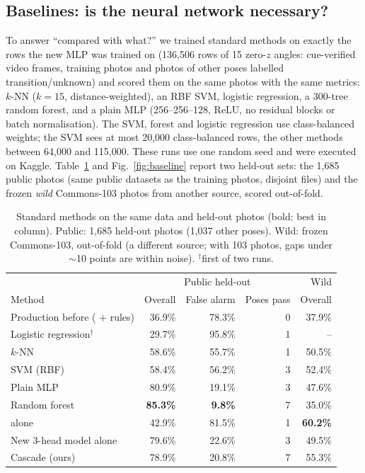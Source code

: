 \subsection{Baselines: is the neural network necessary?}\label{sec:baselines}
To answer ``compared with what?'' we trained standard methods on exactly the rows the new MLP was trained on (136{,}506 rows of 15 zero-$z$ angles: cue-verified video frames, training photos and photos of other poses labelled transition/unknown) and scored them on the same photos with the same metrics: $k$-NN ($k{=}15$, distance-weighted), an RBF SVM, logistic regression, a 300-tree random forest, and a plain MLP (256--256--128, ReLU, no residual blocks or batch normalisation). The SVM, forest and logistic regression use class-balanced weights; the SVM sees at most 20{,}000 class-balanced rows, the other methods between 64{,}000 and 115{,}000. These runs use one random seed and were executed on Kaggle. Table~\ref{tab:baseline} and Fig.~\ref{fig:baseline} report two held-out sets: the 1{,}685 public photos (same public datasets as the training photos, disjoint files) and the frozen \emph{wild} Commons-103 photos from another source, scored out-of-fold.
\begin{table}[t]
\centering\footnotesize\setlength{\tabcolsep}{3.5pt}
\caption{Standard methods on the same data and held-out photos (bold: best in column). Public: 1{,}685 held-out photos (1{,}037 other poses). Wild: frozen Commons-103, out-of-fold (a different source; with 103 photos, gaps under $\sim$10 points are within noise). $^\dagger$first of two runs.}\label{tab:baseline}
\begin{tabular}{@{}lrrrr@{}}
\toprule
 & \multicolumn{3}{c}{Public held-out} & Wild \\
Method & Overall & False alarm & Poses pass & Overall \\ \midrule
Production before (\vfour{} + rules) & 36.9\% & 78.3\% & 0 & 37.9\% \\
Logistic regression$^\dagger$ & 29.7\% & 95.8\% & 1 & -- \\
$k$-NN & 58.6\% & 55.7\% & 1 & 50.5\% \\
SVM (RBF) & 58.4\% & 56.2\% & 3 & 52.4\% \\
Plain MLP & 80.9\% & 19.1\% & 3 & 47.6\% \\
Random forest & \textbf{85.3\%} & \textbf{9.8\%} & 7 & 35.0\% \\
\vfour{} alone & 42.9\% & 81.5\% & 1 & \textbf{60.2\%} \\
New 3-head model alone & 79.6\% & 22.6\% & 3 & 49.5\% \\
Cascade (ours) & 78.9\% & 20.8\% & 7 & 55.3\% \\ \bottomrule
\end{tabular}
\end{table}
